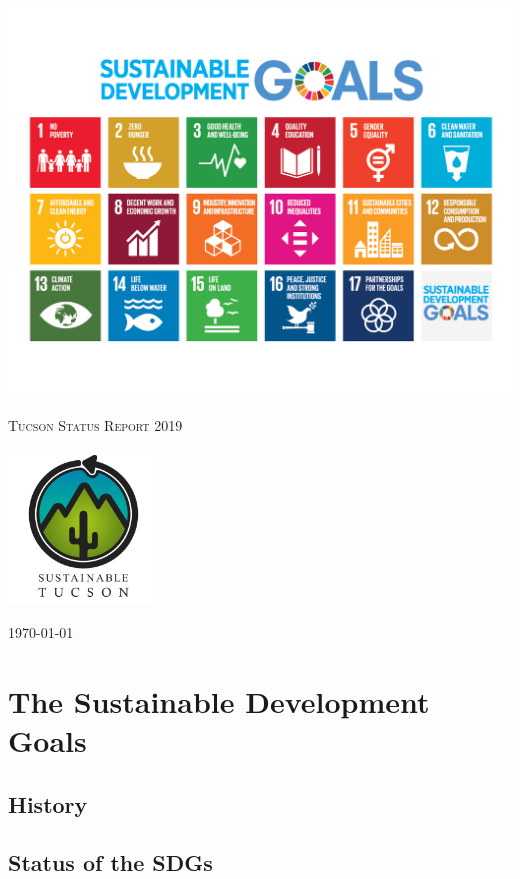 \documentclass[11pt]{book}
\begin{document}
\frontmatter

\begin{titlepage}
	\centering
	\includegraphics[width=1.0\textwidth]{images/sdg-poster.png}\par
	{\scshape\LARGE Tucson Status Report 2019 \par}
	\vspace{1.5cm}
	\includegraphics[width=0.3\textwidth]{images/st-logo.jpg}\par
	\vfill
	{\large\today\par}
\end{titlepage}
	
\chapter{The Sustainable Development Goals}

	\section{History}

	\section{Status of the SDGs}
\end{document}
